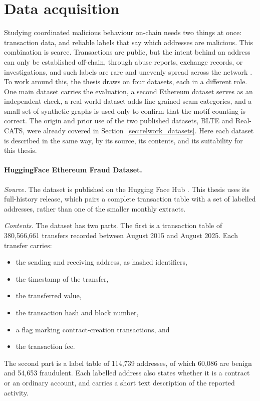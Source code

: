 \documentclass{thesisclass}
\begin{document}
\section{Data acquisition}
\label{sec:data_acquisition}

Studying coordinated malicious behaviour on-chain needs two things at once:
transaction data, and reliable labels that say which addresses are malicious.
This combination is scarce. Transactions are public, but the intent behind an
address can only be established off-chain, through abuse reports, exchange
records, or investigations, and such labels are rare and unevenly spread across
the network \citep{shi2025realcats}. To work around this, the thesis draws on
four datasets, each in a different role. One main dataset carries the
evaluation, a second Ethereum dataset serves as an independent check, a
real-world dataset adds fine-grained scam categories, and a small set of
synthetic graphs is used only to confirm that the motif counting is correct. The
origin and prior use of the two published datasets, BLTE and Real-CATS, were
already covered in Section~\ref{sec:relwork_datasets}. Here each dataset is
described in the same way, by its source, its contents, and its suitability for
this thesis.

\paragraph{HuggingFace Ethereum Fraud Dataset.}
\label{sec:dataset_hf}
\textit{Source.} The dataset is published on the Hugging Face Hub
\citep{fesevu2025ethfraud}. This thesis uses its full-history release, which
pairs a complete transaction table with a set of labelled addresses, rather than
one of the smaller monthly extracts.

\textit{Contents.} The dataset has two parts. The first is a transaction table
of 380{,}566{,}661 transfers recorded between August 2015 and August 2025. Each
transfer carries:
\begin{itemize}
  \item the sending and receiving address, as hashed identifiers,
  \item the timestamp of the transfer,
  \item the transferred value,
  \item the transaction hash and block number,
  \item a flag marking contract-creation transactions, and
  \item the transaction fee.
\end{itemize}
The second part is a label table of 114{,}739 addresses, of which 60{,}086 are
benign and 54{,}653 fraudulent. Each labelled address also states whether it is
a contract or an ordinary account, and carries a short text description of the
reported activity.
\end{document}
